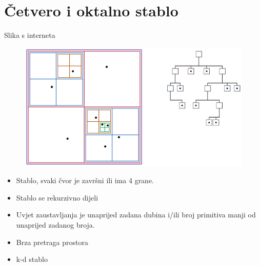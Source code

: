\documentclass[9pt]{beamer}
\begin{document}
%
%
%
%

\section{Četvero i oktalno stablo}
\begin{frame}{Slika s interneta}
	\begin{figure}
		\centering
		\includegraphics[width=0.7\linewidth]{./slike/quadtree.png}
	\end{figure}
\begin{itemize}
	\item Stablo, svaki čvor je završni ili ima 4 grane.
	\item Stablo se rekurzivno dijeli
	\item Uvjet zaustavljanja je unaprijed zadana dubina i/ili broj primitiva manji od unaprijed zadanog broja.
	\item Brza pretraga prostora
	\item k-d stablo
\end{itemize}
\end{frame}
\end{document}
